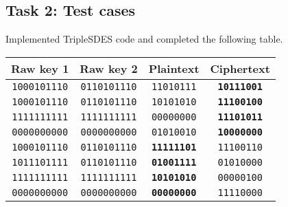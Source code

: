 \documentclass[a4paper,english,12pt]{article}
\begin{document}
\subsection{Task 2: Test cases}

Implemented TripleSDES code and completed the following table.

\begin{table}[H]
  \centering
  \begin{tabular}{cccc}
    \hline 
      \textbf{Raw key 1} &
      \textbf{Raw key 2} &
      \textbf{Plaintext} &
      \textbf{Ciphertext} \\
    \hline

             \texttt{1000101110} &
             \texttt{0110101110} &
               \texttt{11010111} &
       \texttt{\textbf{10111001}} \\

            \texttt{1000101110} &
            \texttt{0110101110} &
              \texttt{10101010} &
      \texttt{\textbf{11100100}} \\

            \texttt{1111111111} &
            \texttt{1111111111} &
              \texttt{00000000} &
      \texttt{\textbf{11101011}} \\

            \texttt{0000000000} &
            \texttt{0000000000} &
              \texttt{01010010} &
      \texttt{\textbf{10000000}} \\

            \texttt{1000101110} &
            \texttt{0110101110} &
      \texttt{\textbf{11111101}} &
              \texttt{11100110} \\

             \texttt{1011101111} &
             \texttt{0110101110} &
       \texttt{\textbf{01001111}} &
               \texttt{01010000} \\

            \texttt{1111111111} &
            \texttt{1111111111} &
      \texttt{\textbf{10101010}} &
              \texttt{00000100} \\

            \texttt{0000000000} &
            \texttt{0000000000} &
      \texttt{\textbf{00000000}} &
              \texttt{11110000} \\

      \hline
  \end{tabular}
  \label{table:task2}
\end{table}
\end{document}
